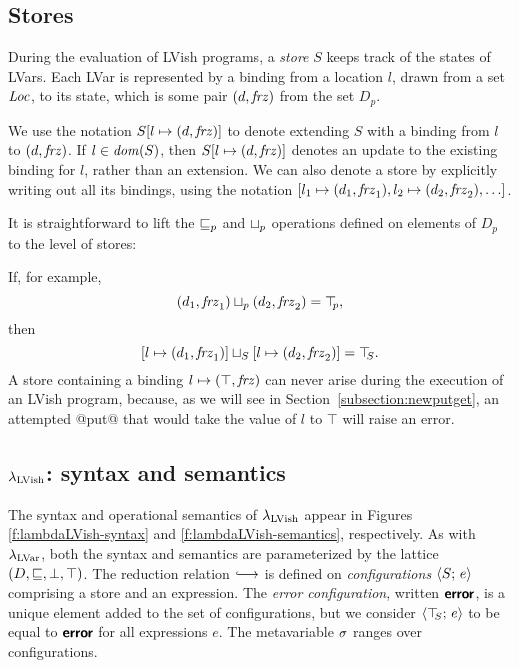 \subsection{Stores}

During the evaluation of LVish programs, a \emph{store} $S$ keeps
track of the states of LVars.  Each LVar is represented by a binding
from a location $l$, drawn from a set $\mathit{Loc}$, to its state, which is
some pair $(d, \mathit{frz})$ from the set $D_p$.

\DefStore

We use the notation $S[l \mapsto (d, \mathit{frz})]$ to denote extending $S$
with a binding from $l$ to $(d, \mathit{frz})$.  If $l \in \mathit{dom}(S)$,
then $S[l \mapsto (d, \mathit{frz})]$ denotes an update to the existing
binding for $l$, rather than an extension.  We can also denote a store
by explicitly writing out all its bindings, using the notation
$\store{\storebinding{l_1}{d_1}{\status_1},
  \storebinding{l_2}{d_2}{\status_2}, \dots}$.

It is straightforward to lift the $\sqsubseteq_p$ and $ \sqcup_p $ operations
defined on elements of $D_p$ to the level of stores:

\DefLeqStore

\DefLubStore

If, for example,
\[ (d_1, \mathit{frz}_1) \sqcup_p (d_2, \mathit{frz}_2) = \top\hspace{-0.85mm}_{p}, \]
then
\[ \left[ l \mapsto (d_1, \mathit{frz}_1) \right] \sqcup_{S} \left[ l \mapsto (d_2, \mathit{frz}_2) \right] =
\top\hspace{-0.85mm}_{S}. \] A store containing a binding
$l \mapsto (\top, \mathit{frz})$ can never arise during the execution
of an LVish program, because, as we will see in
Section~\ref{subsection:newputget}, an attempted @put@ that would
take the value of $l$ to $\top$ will raise an error.

\subsection{$\lambda_{\textrm{LVish}}$: syntax and semantics}

\FigLambdaLVishGrammar

\FigLambdaLVishSemantics


The syntax and operational semantics of $\lambda_{\textrm{LVish}}$ appear in
Figures \ref{f:lambdaLVish-syntax} and \ref{f:lambdaLVish-semantics},
respectively.  As with $\lambda_{\textrm{LVar}}$, both the syntax and semantics
are parameterized by the lattice $(D, \sqsubseteq, \bot, \top)$.  The
reduction relation $\parstepsto$ is defined on \emph{configurations}
$\langle S;\, e \rangle$ comprising a store and an expression.  The \emph{error
  configuration}, written $\textbf{\textsf{error}}$, is a unique element added to the
set of configurations, but we consider $\langle \top\hspace{-0.85mm}_{S};\, e \rangle$ to be equal
to $\textbf{\textsf{error}}$ for all expressions $e$.  The metavariable $\sigma$ ranges
over configurations.

